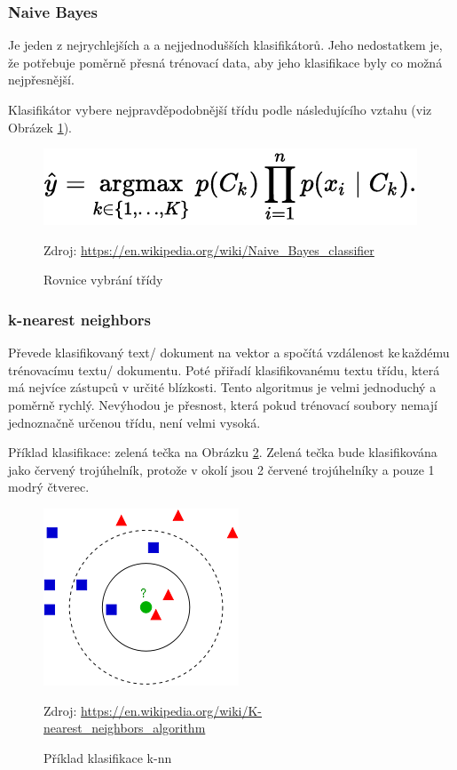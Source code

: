 \documentclass[12pt]{article}
\begin{document}
\subsubsection{Naive Bayes}
Je jeden z nejrychlejších a
a nejjednodušších klasifikátorů. Jeho nedostatkem je, že potřebuje
poměrně přesná trénovací data, aby jeho klasifikace byly co 
možná nejpřesnější.

Klasifikátor vybere nejpravděpodobnější třídu podle následujícího
vztahu (viz Obrázek \ref{fig:nb_class}).
\begin{figure}[H]
        \centering
        \includegraphics[]{img/nb_class.pdf}
        \caption{Rovnice vybrání třídy}
        Zdroj: \url{https://en.wikipedia.org/wiki/Naive\_Bayes\_classifier}
        \label{fig:nb_class}
\end{figure}
\subsubsection{k-nearest neighbors}
Převede klasifikovaný text/ dokument na vektor a spočítá vzdálenost
ke\,každému 
trénovacímu textu/ dokumentu. Poté přiřadí klasifikovanému
textu třídu, která má nejvíce zástupců v určité blízkosti. Tento
algoritmus je velmi jednoduchý a poměrně rychlý. Nevýhodou je přesnost,
která pokud trénovací soubory nemají jednoznačně určenou třídu, není
velmi vysoká.

Příklad klasifikace: zelená tečka na Obrázku \ref{fig:knn}. Zelená 
tečka bude klasifikována jako červený trojúhelník, protože v okolí
jsou 2 červené trojúhelníky a pouze 1 modrý čtverec.
\begin{figure}[H]
        \centering
        \includegraphics[]{img/knn.png}
        \caption{Příklad klasifikace k-nn}
        Zdroj: \url{https://en.wikipedia.org/wiki/K-nearest\_neighbors\_algorithm}
        \label{fig:knn}
\end{figure}
%
%
\end{document}
